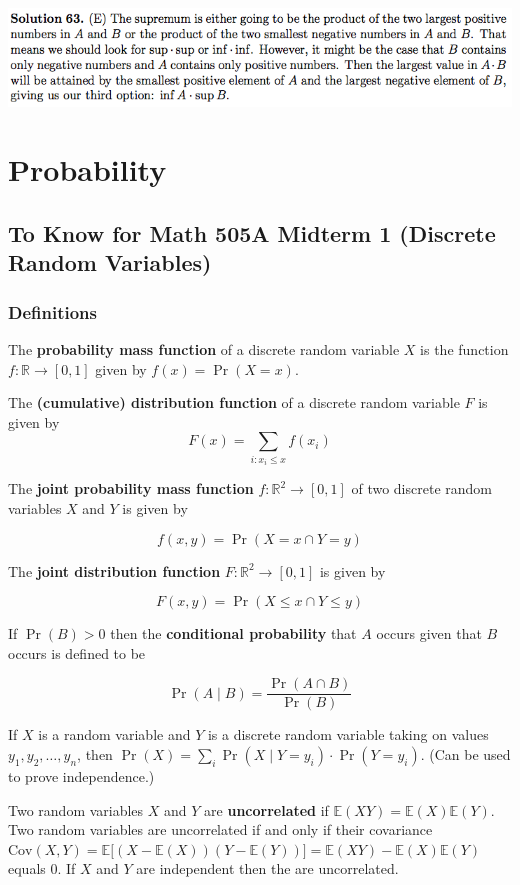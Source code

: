 \documentclass{article}
\newcommand{\E}{\mathbb{E}}
\newcommand{\Cov}{\mathrm{Cov}}
\begin{document}
\includegraphics[scale=0.65]{1268_63s}

\pagebreak


\section{Probability}

\subsection{To Know for Math 505A Midterm 1 (Discrete Random Variables)}

\subsubsection{Definitions}

The \textbf{probability mass function} of a discrete random variable \(X\) is the function \(f: \mathbb{R} \to [0,1]\) given by \(f(x) = \Pr(X = x)\).

The \textbf{(cumulative) distribution function} of a discrete random variable \(F\) is given by \[F(x) = \sum_{i:x_i \leq x} f(x_i)\]

The \textbf{joint probability mass function} \(f: \mathbb{R}^2 \to [0, 1]\) of two discrete random variables \(X\) and \(Y\) is given by

\[
f(x, y) = \Pr(X = x \cap Y = y)
\]

The \textbf{joint distribution function} \(F: \mathbb{R}^2 \to [0, 1]\) is given by

\[
F(x, y) = \Pr(X \leq x \cap Y \leq y)
\]

If \(\Pr(B) > 0\) then the \textbf{conditional probability} that \(A\) occurs given that \(B\) occurs is defined to be

\[
\Pr(A \mid B) = \frac{\Pr(A \cap B)}{\Pr(B)}
\]

If \(X\) is a random variable and \(Y\) is a discrete random variable taking on values \(y_1, y_2, \ldots, y_n\), then \(\Pr(X) = \sum_i \Pr(X \mid Y = y_i) \cdot \Pr(Y = y_i)\). (Can be used to prove independence.)

Two random variables \(X\) and \(Y\) are \textbf{uncorrelated} if \(\E(XY) = \E(X) \E(Y)\). Two random variables are uncorrelated if and only if their covariance \(\Cov(X, Y) = \E \big[(X - \E(X))(Y - \E(Y))\big] = \E(XY) - \E(X)\E(Y)\)  equals 0. If \(X\) and \(Y\) are independent then the are uncorrelated.
\end{document}
